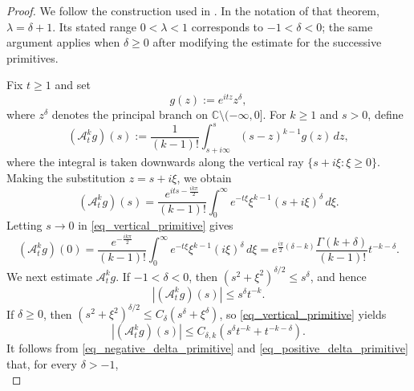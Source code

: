 \documentclass[12pt]{amsart}
\begin{document}
\begin{proof}
We follow the construction used in
\cite[Theorem~2.10]{IoLi2014}. In the notation of that theorem,
$\lambda=\delta+1$. Its stated range $0<\lambda<1$ corresponds to
$-1<\delta<0$; the same argument applies when $\delta\geq0$ after
modifying the estimate for the successive primitives.

Fix $t\geq1$ and set
\begin{equation*}
    g(z):=e^{itz}z^\delta,
\end{equation*}
where $z^\delta$ denotes the principal branch on
$\mathbb{C}\setminus(-\infty,0]$. For $k\geq1$ and $s>0$, define
\begin{equation*}
    (\mathcal A_t^k g)(s)
    :=
    \frac{1}{(k-1)!}
    \int_{s+i\infty}^{s}
    (s-z)^{k-1}g(z)\,dz,
\end{equation*}
where the integral is taken downwards along the vertical ray
$\{s+i\xi:\xi\geq0\}$. Making the substitution $z=s+i\xi$, we obtain
\begin{equation}\label{eq_vertical_primitive}
    (\mathcal A_t^k g)(s)
    =
    \frac{e^{its-\frac{ik\pi}{2}}}{(k-1)!}
    \int_0^\infty
    e^{-t\xi}\xi^{k-1}(s+i\xi)^\delta\,d\xi .
\end{equation}
Letting $s\to 0$ in \eqref{eq_vertical_primitive} gives
\begin{equation}\label{eq_vertical_primitive_endpoint}
    (\mathcal A_t^k g)(0) =
    \frac{e^{-\frac{ik\pi}{2}}}{(k-1)!}
    \int_0^\infty
    e^{-t\xi}\xi^{k-1}(i\xi)^\delta\,d\xi  =
    e^{\frac{i\pi}{2}(\delta-k)}
    \frac{\Gamma(k+\delta)}{(k-1)!}
    t^{-k-\delta}.
\end{equation}
We next estimate $\mathcal A_t^k g$. If $-1<\delta<0$, then $(s^2+\xi^2)^{\delta/2}\leq s^\delta$, and hence 
\begin{equation}\label{eq_negative_delta_primitive}
    |(\mathcal A_t^k g)(s)|
    \leq s^\delta t^{-k}.
\end{equation}
If $\delta\geq0$, then $(s^2+\xi^2)^{\delta/2}
    \leq C_\delta(s^\delta+\xi^\delta)$, so \eqref{eq_vertical_primitive} yields
\begin{equation}\label{eq_positive_delta_primitive}
    |(\mathcal A_t^k g)(s)|
    \leq
    C_{\delta,k}
    \left(
        s^\delta t^{-k}
        +t^{-k-\delta}
    \right).
\end{equation}
It follows from \eqref{eq_negative_delta_primitive} and
\eqref{eq_positive_delta_primitive} that, for every $\delta>-1$,
\begin{equation}\label{eq_integrated_primitive}

\end{equation}
\end{proof}
\end{document}
